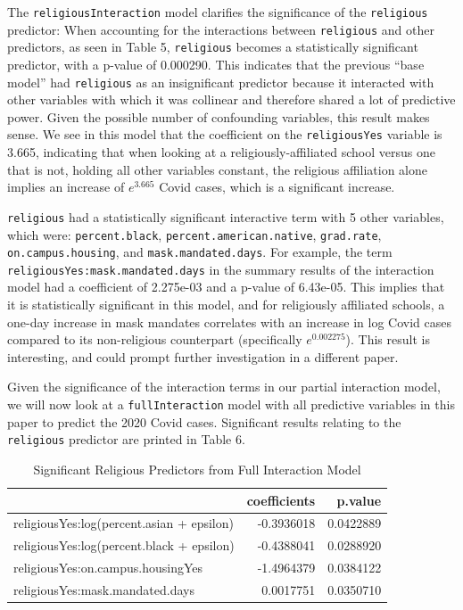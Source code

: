 \documentclass[
]{article}
\begin{document}
The \texttt{religiousInteraction} model clarifies the significance of
the \texttt{religious} predictor: When accounting for the interactions
between \texttt{religious} and other predictors, as seen in Table 5,
\texttt{religious} becomes a statistically significant predictor, with a
p-value of 0.000290. This indicates that the previous ``base model'' had
\texttt{religious} as an insignificant predictor because it interacted
with other variables with which it was collinear and therefore shared a
lot of predictive power. Given the possible number of confounding
variables, this result makes sense. We see in this model that the
coefficient on the \texttt{religiousYes} variable is 3.665, indicating
that when looking at a religiously-affiliated school versus one that is
not, holding all other variables constant, the religious affiliation
alone implies an increase of \(e^{3.665}\) Covid cases, which is a
significant increase.

\texttt{religious} had a statistically significant interactive term with
5 other variables, which were: \texttt{percent.black},
\texttt{percent.american.native}, \texttt{grad.rate},
\texttt{on.campus.housing}, and \texttt{mask.mandated.days}. For
example, the term \texttt{religiousYes:mask.mandated.days} in the
summary results of the interaction model had a coefficient of 2.275e-03
and a p-value of 6.43e-05. This implies that it is statistically
significant in this model, and for religiously affiliated schools, a
one-day increase in mask mandates correlates with an increase in log
Covid cases compared to its non-religious counterpart (specifically
\(e^{0.002275}\)). This result is interesting, and could prompt further
investigation in a different paper.

Given the significance of the interaction terms in our partial
interaction model, we will now look at a \texttt{fullInteraction} model
with all predictive variables in this paper to predict the 2020 Covid
cases. Significant results relating to the \texttt{religious} predictor
are printed in Table 6.

\begin{table}

\caption{\label{tab:unnamed-chunk-20}Significant Religious Predictors from Full Interaction Model}
\centering
\begin{tabular}[t]{l|r|r}
\hline
  & coefficients & p.value\\
\hline
religiousYes:log(percent.asian + epsilon) & -0.3936018 & 0.0422889\\
\hline
religiousYes:log(percent.black + epsilon) & -0.4388041 & 0.0288920\\
\hline
religiousYes:on.campus.housingYes & -1.4964379 & 0.0384122\\
\hline
religiousYes:mask.mandated.days & 0.0017751 & 0.0350710\\
\hline
\end{tabular}
\end{table}
\end{document}

